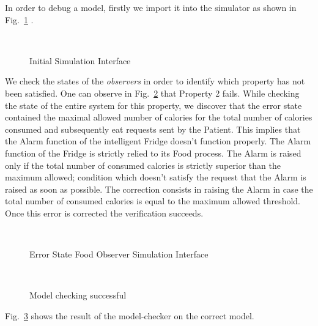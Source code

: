 \documentclass[a4paper,twoside]{article}
\begin{document}
In order to  debug  a model, firstly we import it into the simulator as shown in Fig.~\ref{fig:initialsimulationinterface} .

\begin{figure}[!h]
  \vspace{8cm}~
  \centering
  {}
  \caption{Initial Simulation Interface}
  \label{fig:initialsimulationinterface}
 \end{figure}

We check the states of the \textit{observers} in order to identify which property has not been satisfied. One can observe in Fig.~\ref{fig:errorstatefoodobserver} that Property 2 fails. While checking the state of the entire system for this property, we discover that the error state contained the maximal allowed number of calories for the total number of calories consumed and subsequently eat requests sent by the Patient. This implies that the Alarm function of the intelligent Fridge doesn't function properly. The Alarm function of the Fridge is strictly relied to its Food process. 
The Alarm is raised only if the total number of consumed calories is strictly superior than the maximum allowed; condition which doesn't satisfy the request that the Alarm is raised as soon as possible. The correction consists in raising the Alarm in case the total number of consumed calories is equal to the maximum allowed threshold. Once this error is corrected the verification succeeds.

\begin{figure}[!h]
  \vspace{8cm}~
  \centering
  {}
  \caption{Error State Food Observer Simulation Interface}
  \label{fig:errorstatefoodobserver}
 \end{figure}

\begin{figure}[!h]
  \vspace{8cm}~
  \centering
  {}
  \caption{Model checking successful}
  \label{fig:verificationok}
 \end{figure} 

Fig.~\ref{fig:verificationok} shows the result of the model-checker on the correct model.
\end{document}
